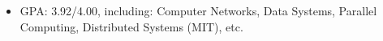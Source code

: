 
\begin{itemize}[nosep]
  \item GPA: 3.92/4.00, including: Computer Networks, Data Systems, Parallel Computing, Distributed Systems (MIT), etc.
\end{itemize}
